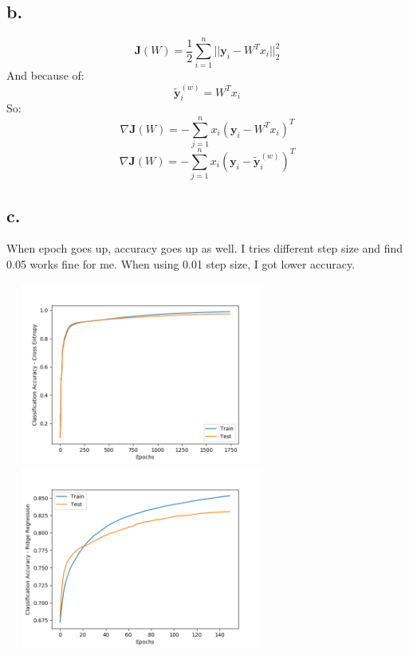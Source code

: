 \documentclass{article}
\begin{document}
\subsection*{b.}
\[ \mathbf{J}(W) = \frac{1}{2} \sum_{i=1}^{n} || \mathbf{y}_i - W^T x_i ||^2_2  \]
And because of:
\[ \tilde{\mathbf{y}}_i^{(w)} = W^Tx_i \]
So:
\[ \nabla  \mathbf{J}(W) = - \sum_{j=1}^{n} x_i (\mathbf{y}_i - W^Tx_i)^T \]
\[ \nabla  \mathbf{J}(W) = - \sum_{j=1}^{n} x_i (\mathbf{y}_i  - \tilde{ \mathbf{y} }_i^{(w)})^T \]


\subsection*{c.}

When epoch goes up, accuracy goes up as well. 
I tries different step size and find 0.05 works fine for me. When using 0.01 step size, I got lower accuracy.

\includegraphics[width=9cm, height=6cm]{B4_c_1.png}
\includegraphics[width=9cm, height=6cm]{B4_c_2.png}
\end{document}
